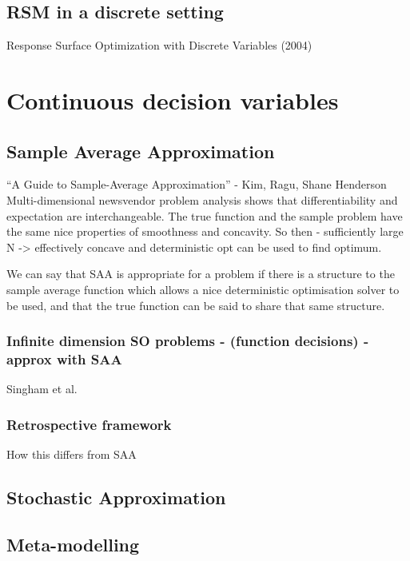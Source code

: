 \message{ !name(SO-Methods.tex)}\documentclass{article}
\begin{document}
\subsection{RSM in a discrete setting}

Response Surface Optimization with Discrete Variables (2004)

\section{Continuous decision variables}

\subsection{Sample Average Approximation}

``A Guide to Sample-Average Approximation'' - Kim, Ragu, Shane Henderson
Multi-dimensional newsvendor problem analysis shows that differentiability and expectation are interchangeable. The true function and the sample problem have the same nice properties of smoothness and concavity. So then - sufficiently large N -> effectively concave and deterministic opt can be used to find optimum.

We can say that SAA is appropriate for a problem if there is a structure to the sample average function which allows a nice deterministic optimisation solver to be used, and that the true function can be said to share that same structure.

\subsubsection{Infinite dimension SO problems - (function decisions) - approx with SAA}

Singham et al. 

\subsubsection{Retrospective framework}

How this differs from SAA

\subsection{Stochastic Approximation}

\subsection{Meta-modelling}
\end{document}
